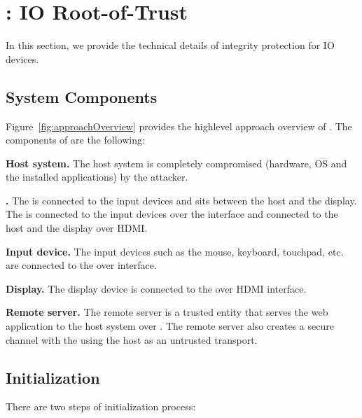 \section{\name: IO Root-of-Trust}
\label{sec:systemDesign}


In this section, we provide the technical details of \name integrity protection for IO devices.  

\subsection{System Components}
\label{sec:systemDesign:components}

Figure~\ref{fig:approachOverview} provides the highlevel approach overview of \name. The components of \name are the following:

\begin{mylist}
  \item \textbf{Host system.} The host system is completely compromised (hardware, OS and the installed applications) by the attacker.
  \item \textbf{\device.} The \device is connected to the input devices and sits between the host and the display. The \device is connected to the input devices over the \usb interface and connected to the host and the display over HDMI.
  \item \textbf{Input device.} The input devices such as the mouse, keyboard, touchpad, etc. are connected to the \device over \usb interface.
  \item \textbf{Display.} The display device is connected to the \device over HDMI interface.
  \item \textbf{Remote server.} The remote server is a trusted entity that serves the web application to the host system over \http. The remote server also creates a secure channel with the \device using the host as an untrusted transport. 
  
\end{mylist}

\subsection{Initialization} 
\label{sec:systemDesign:init}

There are two steps of initialization process: 

